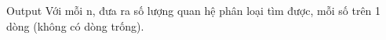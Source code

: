 Output
Với mỗi n, đưa ra số lượng quan hệ phân loại tìm được, mỗi số trên 1 dòng (không có dòng trống).